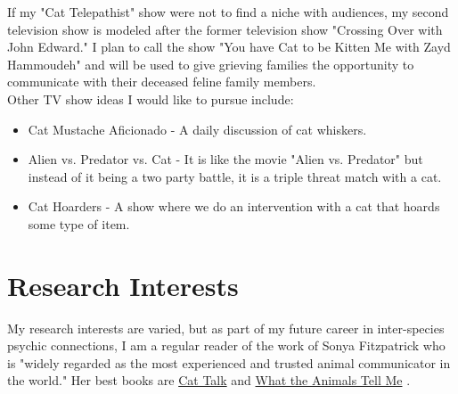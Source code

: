 \documentclass{article}
\begin{document}
If my "Cat Telepathist" show were not to find a niche with audiences, my second television show is modeled after the former television show "Crossing Over with John Edward." \cite{calderwood} I plan to call the show "You have Cat to be Kitten Me with Zayd Hammoudeh" and will be used to give grieving families the opportunity to communicate with their deceased feline family members.\\

Other TV show ideas I would like to pursue include:
\begin{itemize}
	\item Cat Mustache Aficionado - A daily discussion of cat whiskers.
	\item Alien vs. Predator vs. Cat - It is like the movie "Alien vs. Predator" but instead of it being a two party battle, it is a triple threat match with a cat.
	\item Cat Hoarders - A show where we do an intervention with a cat that hoards some type of item.
\end{itemize}

\section{Research Interests}

My research interests are varied, but as part of my future career in inter-species psychic connections, I am a regular reader of the work of Sonya Fitzpatrick who is "widely regarded as the most experienced and trusted animal communicator in the world." \cite{fitzpatrick_2013}  Her best books are \underline{Cat Talk} \cite{fitzpatrick2003cat} and \underline{What the Animals Tell Me} \cite{fitzpatrick_smith_1997}.




\end{document}
